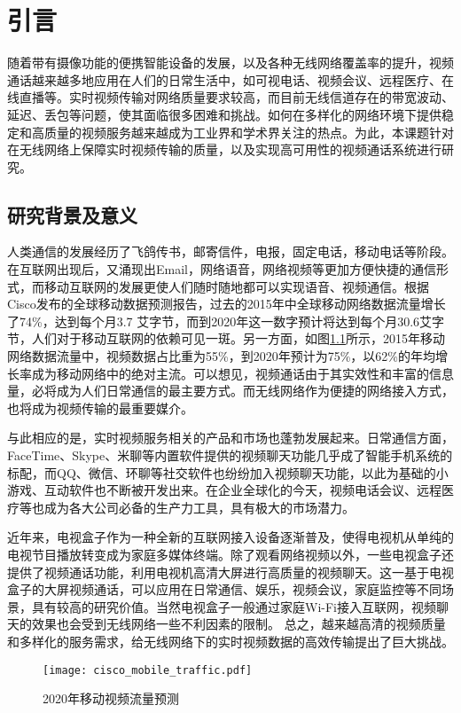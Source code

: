 \chapter{引言}
\label{chap:intro}
随着带有摄像功能的便携智能设备的发展，以及各种无线网络覆盖率的提升，视频通话越来越多地应用在人们的日常生活中，如可视电话、视频会议、远程医疗、在线直播等。实时视频传输对网络质量要求较高，而目前无线信道存在的带宽波动、延迟、丢包等问题，使其面临很多困难和挑战。如何在多样化的网络环境下提供稳定和高质量的视频服务越来越成为工业界和学术界关注的热点。为此，本课题针对在无线网络上保障实时视频传输的质量，以及实现高可用性的视频通话系统进行研究。

\section{研究背景及意义}
人类通信的发展经历了飞鸽传书，邮寄信件，电报，固定电话，移动电话等阶段。在互联网出现后，又涌现出Email，网络语音，网络视频等更加方便快捷的通信形式，而移动互联网的发展更使人们随时随地都可以实现语音、视频通信。根据Cisco发布的全球移动数据预测报告\cite{index2016global}，过去的2015年中全球移动网络数据流量增长了74\%，达到每个月3.7 艾字节，而到2020年这一数字预计将达到每个月30.6艾字节，人们对于移动互联网的依赖可见一斑。另一方面，如图\ref{fig:cisco_mobile}所示，2015年移动网络数据流量中，视频数据占比重为55\%，到2020年预计为75\%，以62\%的年均增长率成为移动网络中的绝对主流。可以想见，视频通话由于其实效性和丰富的信息量，必将成为人们日常通信的最主要方式。而无线网络作为便捷的网络接入方式，也将成为视频传输的最重要媒介。

与此相应的是，实时视频服务相关的产品和市场也蓬勃发展起来。日常通信方面，FaceTime、Skype、米聊等内置软件提供的视频聊天功能几乎成了智能手机系统的标配，而QQ、微信、环聊等社交软件也纷纷加入视频聊天功能，以此为基础的小游戏、互动软件也不断被开发出来。在企业全球化的今天，视频电话会议、远程医疗等也成为各大公司必备的生产力工具，具有极大的市场潜力。

近年来，电视盒子作为一种全新的互联网接入设备逐渐普及，使得电视机从单纯的电视节目播放转变成为家庭多媒体终端。除了观看网络视频以外，一些电视盒子还提供了视频通话功能，利用电视机高清大屏进行高质量的视频聊天。这一基于电视盒子的大屏视频通话，可以应用在日常通信、娱乐，视频会议，家庭监控等不同场景，具有较高的研究价值。当然电视盒子一般通过家庭Wi-Fi接入互联网，视频聊天的效果也会受到无线网络一些不利因素的限制。
总之，越来越高清的视频质量和多样化的服务需求，给无线网络下的实时视频数据的高效传输提出了巨大挑战。

\begin{figure}[htbp]
  \centering
  \texttt{[image: cisco\_mobile\_traffic.pdf]}
  \caption{2020年移动视频流量预测}
  \label{fig:cisco_mobile}
\end{figure}

